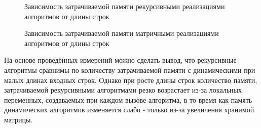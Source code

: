 \documentclass[12pt, a4paper]{report}
\begin{document}
\begin{figure} [H]
\begin{center}
\end{center}
	\caption{Зависимость затрачиваемой памяти рекурсивными реализациями алгоритмов от длины строк}
\end{figure}

\begin{figure} [H]
	\begin{center}
	\end{center}
	\caption{Зависимость затрачиваемой памяти матричными реализациями алгоритмов от длины строк}
\end{figure}

\par
На основе проведённых измерений можно сделать вывод, что рекурсивные алгоритмы сравнимы по количеству затрачиваемой памяти с динамическими при малых длинах входных строк. Однако при росте длины строк количество памяти, затрачиваемой рекурсивными алгоритмами резко возрастает из-за локальных переменных, создаваемых при каждом вызове алгоритма, в то время как память динамических алгоритмов изменяется слабо - только из-за увеличения хранимой матрицы.
\end{document}
